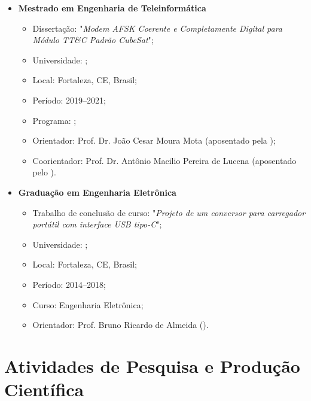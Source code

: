 \documentclass{article}
\begin{document}
\begin{itemize}
\begin{itemize}
    \item Período: 2021--2026;
    \item Programa: ;
    \item Grupo de pesquisa: .
    \item Orientador: Prof. Dr. Felix Dieter Antreich (), 
    \item Co-orientador: Prof. André Lima Ferrer de Almeida ().
  \end{itemize}
  \item \textbf{Mestrado em Engenharia de Teleinformática}
  \begin{itemize}
    \item Dissertação: "\emph{Modem AFSK Coerente e Completamente Digital para Módulo TT\&C Padrão CubeSat}";
    \item Universidade: ;
    \item Local: Fortaleza, CE, Brasil;
    \item Período: 2019--2021;
    \item Programa: ;
    \item Orientador: Prof. Dr. João Cesar Moura Mota (aposentado pela );
    \item Coorientador: Prof. Dr. Antônio Macilio Pereira de Lucena (aposentado pelo ).
  \end{itemize}
  \item \textbf{Graduação em Engenharia Eletrônica}
  \begin{itemize}
    \item Trabalho de conclusão de curso: "\emph{Projeto de um conversor para carregador portátil com interface USB tipo-C}";
    \item Universidade: ;
    \item Local: Fortaleza, CE, Brasil;
    \item Período: 2014--2018;
    \item Curso: Engenharia Eletrônica;
    \item Orientador: Prof. Bruno Ricardo de Almeida ().
  \end{itemize}
\end{itemize}

\section{Atividades de Pesquisa e Produção Científica}
\end{document}
